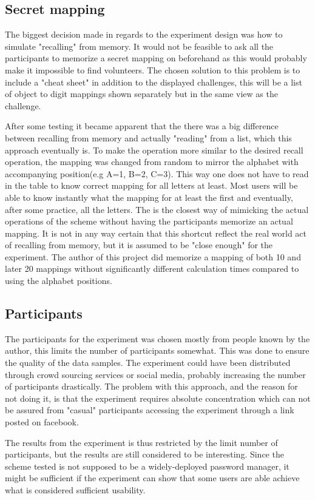 \subsection{Secret mapping} The biggest decision made in regards to the experiment design was how to simulate "recalling" from memory. It would not be feasible to ask all the participants to memorize a secret mapping on beforehand as this would probably make it impossible to find volunteers. The chosen solution to this problem is to include a "cheat sheet" in addition to the displayed challenges, this will be a list of object to digit mappings shown separately but in the same view as the challenge.
\par After some testing it became apparent that the there was a big difference between recalling from memory and actually "reading" from a list, which this approach eventually is. To make the operation more similar to the desired recall operation, the mapping was changed from random to mirror the alphabet with accompanying position(e.g A=1, B=2, C=3). This way one does not have to read in the table to know correct mapping for all letters at least. Most users will be able to know instantly what the mapping for at least the first and eventually, after some practice, all the letters. The is the closest way of mimicking the actual operations of the scheme without having the participants memorize an actual mapping. It is not in any way certain that this shortcut reflect the real world act of recalling from memory, but it is assumed to be "close enough" for the experiment. The author of this project did memorize a mapping of both 10 and later 20 mappings without significantly different calculation times compared to using the alphabet positions.


\subsection{Participants}
The participants for the experiment was chosen mostly from people known by the author, this limits the number of participants somewhat. This was done to ensure the quality of the data samples. The experiment could have been distributed through crowd sourcing services or social media, probably increasing the number of participants drastically. The problem with this approach, and the reason for not doing it, is that the experiment requires absolute concentration which can not be assured from "casual" participants accessing the experiment through a link posted on facebook. 
\par The results from the experiment is thus restricted  by the limit number of participants, but the results are still considered to be interesting. Since the scheme tested is not supposed to be a widely-deployed password manager, it might be sufficient if the experiment can show that some users are able achieve what is considered sufficient usability. 




